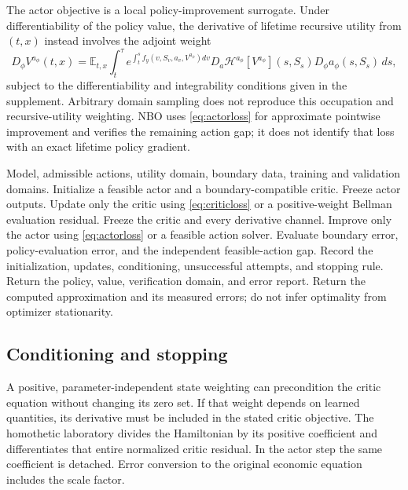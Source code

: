 \documentclass[ecta,draft]{econsocart}
\theoremstyle{definition}
\theoremstyle{remark}
\newcommand{\E}{\mathbb E}
\newcommand{\HH}{\mathcal H}
\begin{document}
The actor objective is a local policy-improvement surrogate. Under differentiability of the policy value, the derivative of lifetime recursive utility from $(t,x)$ instead involves the adjoint weight
\begin{equation}\label{eq:gradient}
 D_\phi V^{a_\phi}(t,x)=\E_{t,x}\int_t^\tau
 e^{\int_t^s f_y(v,S_v,a_v,V^{a_\phi})dv}
 D_a\HH^{a_\phi}[V^{a_\phi}](s,S_s)D_\phi a_\phi(s,S_s)\,ds,
\end{equation}
subject to the differentiability and integrability conditions given in the supplement. Arbitrary domain sampling does not reproduce this occupation and recursive-utility weighting. NBO uses \eqref{eq:actorloss} for approximate pointwise improvement and verifies the remaining action gap; it does not identify that loss with an exact lifetime policy gradient.

\begin{algorithm}[t]
\caption{NBO evaluation, improvement, and acceptance}\label{alg:nbo}
\begin{algorithmic}[1]
\Require Model, admissible actions, utility domain, boundary data, training and validation domains.
\State Initialize a feasible actor and a boundary-compatible critic.
 \State Freeze actor outputs. Update only the critic using \eqref{eq:criticloss} or a positive-weight Bellman evaluation residual.
 \State Freeze the critic and every derivative channel. Improve only the actor using \eqref{eq:actorloss} or a feasible action solver.
 \State Evaluate boundary error, policy-evaluation error, and the independent feasible-action gap.
 \State Record the initialization, updates, conditioning, unsuccessful attempts, and stopping rule.
  \State Return the policy, value, verification domain, and error report.
 \EndIf
\EndFor
\State Return the computed approximation and its measured errors; do not infer optimality from optimizer stationarity.
\end{algorithmic}
\end{algorithm}

\subsection{Conditioning and stopping}
A positive, parameter-independent state weighting can precondition the critic equation without changing its zero set. If that weight depends on learned quantities, its derivative must be included in the stated critic objective. The homothetic laboratory divides the Hamiltonian by its positive coefficient and differentiates that entire normalized critic residual. In the actor step the same coefficient is detached. Error conversion to the original economic equation includes the scale factor.
\end{document}
